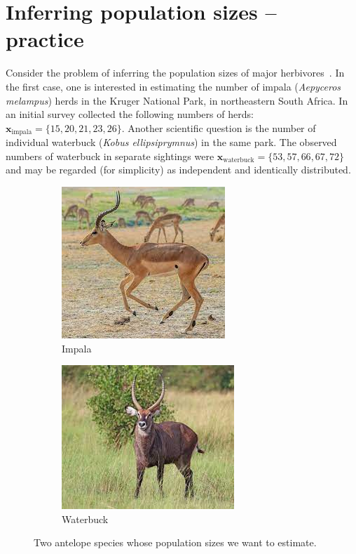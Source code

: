 \documentclass[a4paper,10pt, notitlepage]{report}
\begin{document}
\section*{Inferring population sizes -- practice}
Consider the problem of inferring the population sizes of major herbivores~\citep{Carroll1985}.
In the first case, one is interested in estimating the number of impala (\textit{Aepyceros melampus}) herds in the Kruger National Park, in northeastern South Africa.
In an initial survey collected the following numbers of herds: $\boldsymbol{x}_{\text{impala}} = \{15, 20, 21, 23, 26\}$.
Another scientific question is the number of individual waterbuck (\textit{Kobus ellipsiprymnus}) in the same park.
The observed numbers of waterbuck in separate sightings were $\boldsymbol{x}_{\text{waterbuck}} = \{53, 57, 66, 67, 72\}$ and may be regarded (for simplicity) as independent and identically distributed.

\begin{figure}[H]
     \centering
     \begin{subfigure}[b]{0.45\textwidth}
         \centering
         \includegraphics[scale=0.75]{figures/impala.jpeg}
         \caption{Impala}
     \end{subfigure}
     \begin{subfigure}[b]{0.45\textwidth}
         \centering
         \includegraphics[scale=0.75]{figures/waterbuck.jpeg}
         \caption{Waterbuck}
     \end{subfigure}
        \caption{Two antelope species whose population sizes we want to estimate.}
        \label{fig:antelopes}
\end{figure}
\end{document}
